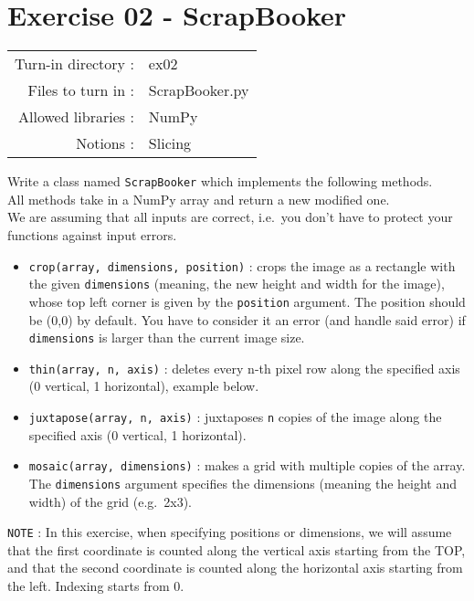 \documentclass[]{article}
\begin{document}
\clearpage

\hypertarget{exercise-02---scrapbooker-1}{%
\section{Exercise 02 - ScrapBooker}\label{exercise-02---scrapbooker-1}}

\begin{longtable}[]{@{}rl@{}}
\toprule
\endhead
Turn-in directory : & ex02\tabularnewline
Files to turn in : & ScrapBooker.py\tabularnewline
Allowed libraries : & NumPy\tabularnewline
Notions : & Slicing\tabularnewline
\bottomrule
\end{longtable}

Write a class named \texttt{ScrapBooker} which implements the following
methods.\\
All methods take in a NumPy array and return a new modified one.\\
We are assuming that all inputs are correct, i.e.~you don't have to
protect your functions against input errors.

\begin{itemize}
\item
  \texttt{crop(array,\ dimensions,\ position)} : crops the image as a
  rectangle with the given \texttt{dimensions} (meaning, the new height
  and width for the image), whose top left corner is given by the
  \texttt{position} argument. The position should be (0,0) by default.
  You have to consider it an error (and handle said error) if
  \texttt{dimensions} is larger than the current image size.
\item
  \texttt{thin(array,\ n,\ axis)} : deletes every n-th pixel row along
  the specified axis (0 vertical, 1 horizontal), example below.
\item
  \texttt{juxtapose(array,\ n,\ axis)} : juxtaposes \texttt{n} copies of
  the image along the specified axis (0 vertical, 1 horizontal).
\item
  \texttt{mosaic(array,\ dimensions)} : makes a grid with multiple
  copies of the array. The \texttt{dimensions} argument specifies the
  dimensions (meaning the height and width) of the grid (e.g.~2x3).
\end{itemize}

\texttt{NOTE} : In this exercise, when specifying positions or
dimensions, we will assume that the first coordinate is counted along
the vertical axis starting from the TOP, and that the second coordinate
is counted along the horizontal axis starting from the left. Indexing
starts from 0.
\end{document}
